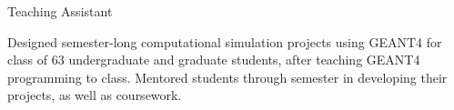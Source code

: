 \begin{rSubsection}{}{}{Teaching Assistant}{}

\begin{list1}
\item[] Designed semester-long computational simulation projects using GEANT4 for class of 63
undergraduate and graduate students, after teaching GEANT4 programming to class.
Mentored students through semester in developing their projects, as well as coursework.

\end{list1}
\end{rSubsection}




